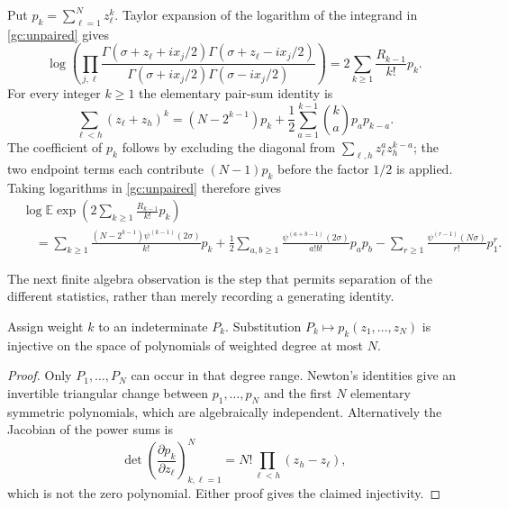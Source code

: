Put $p_k=\sum_{\ell=1}^N z_\ell^k$. Taylor expansion of the logarithm
of the integrand in \eqref{gc:unpaired} gives
\[
 \log\left(\prod_{j,\ell}\frac{\Gamma(\sigma+z_\ell+ix_j/2)
     \Gamma(\sigma+z_\ell-ix_j/2)}
     {\Gamma(\sigma+ix_j/2)\Gamma(\sigma-ix_j/2)}\right)
            =2\sum_{k\ge1}\frac{R_{k-1}}{k!}p_k.
\]
For every integer $k\ge1$ the elementary pair-sum identity is
\begin{equation}\label{gc:pairsum}
 \sum_{\ell<h}(z_\ell+z_h)^k
 =(N-2^{k-1})p_k+\frac12\sum_{a=1}^{k-1}
                              \binom ka p_a p_{k-a}.
\end{equation}
The coefficient of $p_k$ follows by excluding the diagonal from
$\sum_{\ell,h}z_\ell^a z_h^{k-a}$; the two endpoint terms each
contribute $(N-1)p_k$ before the factor $1/2$ is applied.
Taking logarithms in \eqref{gc:unpaired} therefore gives
\begin{equation}\label{gc:power-sum-log}
\begin{split}
 &\log\mathbb E\exp\left(2\sum_{k\ge1}\frac{R_{k-1}}{k!}p_k\right)\\
 &\quad=\sum_{k\ge1}
       \frac{(N-2^{k-1})\psi^{(k-1)}(2\sigma)}{k!}p_k
       +\frac12\sum_{a,b\ge1}
          \frac{\psi^{(a+b-1)}(2\sigma)}{a!b!}p_a p_b
       -\sum_{r\ge1}\frac{\psi^{(r-1)}(N\sigma)}{r!}p_1^r.
\end{split}
\end{equation}

The next finite algebra observation is the step that permits separation
of the different statistics, rather than merely recording a generating
identity.

\begin{lemma}
\label{gc:psindependent}
Assign weight $k$ to an indeterminate $P_k$. Substitution
$P_k\mapsto p_k(z_1,\ldots,z_N)$ is injective on the space of
polynomials of weighted degree at most $N$.
\end{lemma}
\begin{proof}
Only $P_1,\ldots,P_N$ can occur in that degree range.
Newton's identities give an invertible triangular change between
$p_1,\ldots,p_N$ and the first $N$ elementary symmetric polynomials,
which are algebraically independent. Alternatively the Jacobian of
the power sums is
\[
 \det\left(\frac{\partial p_k}{\partial z_\ell}\right)_{k,\ell=1}^N
              =N!\prod_{\ell<h}(z_h-z_\ell),
\]
which is not the zero polynomial. Either proof gives the claimed
injectivity.
\end{proof}

